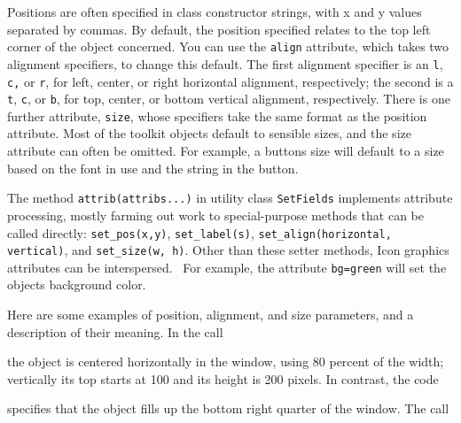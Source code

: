 Positions are often specified in class constructor
strings, with x and y values separated by commas. By default, the
position specified relates to the top left corner of the object
concerned. You can use the \texttt{{\textquotedbl}align{\textquotedbl}}
attribute, which takes two alignment specifiers, to change this
default. The first alignment specifier is an
\texttt{{\textquotedbl}l{\textquotedbl}},
\texttt{{\textquotedbl}c{\textquotedbl}}\texttt{,} or
\texttt{{\textquotedbl}r{\textquotedbl}}, for left, center, or right
horizontal alignment, respectively; the second is a
\texttt{{\textquotedbl}t{\textquotedbl}},
\texttt{{\textquotedbl}c{\textquotedbl}}, or
\texttt{{\textquotedbl}b{\textquotedbl}}, for top, center, or bottom
vertical alignment, respectively. There is one further attribute,
\texttt{{\textquotedbl}size{\textquotedbl}}, whose specifiers take the
same format as the position attribute. Most of the toolkit objects
default to sensible sizes, and the size attribute can often be omitted.
For example, a button{\textquotesingle}s size will default to a size
based on the font in use and the string in the button.

The method \texttt{attrib(attribs...)} in utility class
\texttt{SetFields} implements attribute
processing, mostly farming out work to special-purpose methods
that can be called directly: \texttt{set\_pos(x,y)},
\texttt{set\_label(s)}, \texttt{set\_align(horizontal, vertical)}, and
\texttt{set\_size(w, }\texttt{h)}. Other than these setter methods,
Icon graphics attributes can be interspersed. \ For example, the
attribute \texttt{{\textquotedbl}bg=green{\textquotedbl}} will set the
object{\textquotesingle}s background color.

Here are some examples of position, alignment, and size parameters, and
a description of their meaning. In the call


\noindent
the object is centered horizontally in the window, using 80
percent of the width; vertically its top starts at 100 and its
height is 200 pixels. In contrast, the code


\noindent
specifies that the object fills up the bottom right quarter of the
window. The call

